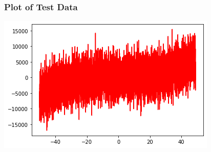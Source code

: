 \documentclass{article}
\begin{document}
\subsubsection{Plot of Test Data}
\includegraphics[scale=.9]{images/test-2.png}
\end{document}
